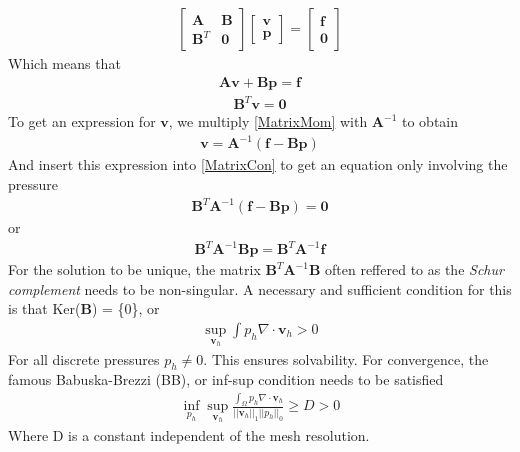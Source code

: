 \begin{align}
\begin{bmatrix}
\mathbf{A} & \mathbf{B} \\
\mathbf{B}^T & \mathbf{0}
\end{bmatrix}
\begin{bmatrix}
\mathbf{v} \\
\mathbf{p}
\end{bmatrix}   = 
\begin{bmatrix}
\mathbf{f} \\
\mathbf{0}
\end{bmatrix}
\end{align}
Which means that
\begin{align}
\mathbf{A}\mathbf{v} + \mathbf{B}\mathbf{p} = \mathbf{f} \label{MatrixMom}
\end{align}
\begin{align}
\mathbf{B}^T \mathbf{v} = \mathbf{0}   \label{MatrixCon}
\end{align}
To get an expression for $\mathbf{v}$, we multiply \eqref{MatrixMom} with $\mathbf{A}^{-1}$ to obtain
\begin{align}
\mathbf{v} = \mathbf{A}^{-1}(\mathbf{f} - \mathbf{B}\mathbf{p})
\end{align}
And insert this expression into \eqref{MatrixCon} to get an equation only involving the pressure
\begin{align}
\mathbf{B}^T \mathbf{A}^{-1}(\mathbf{f} - \mathbf{B}\mathbf{p}) = \mathbf{0}
\end{align}
or
\begin{align}
\mathbf{B}^T\mathbf{A}^{-1}\mathbf{B}\mathbf{p} = \mathbf{B}^T\mathbf{A}^{-1}\mathbf{f}
\end{align}
For the solution to be unique, the matrix $\mathbf{B}^T\mathbf{A}^{-1}\mathbf{B}$ often reffered to as the \textit{Schur complement} needs to be non-singular. A necessary and sufficient condition for this is that Ker($\mathbf{B}$) = \{0\}, or
\begin{align}
\sup_{\mathbf{v}_h}\int p_h \nabla \cdot \mathbf{v}_h > 0
\end{align}
For all discrete pressures $p_h \neq 0$. 
This ensures solvability. For convergence, the famous Babuska-Brezzi (BB), or inf-sup condition needs to be satisfied \cite{Brez12}
\begin{align}
\inf_{p_h}\sup_{\mathbf{v}_h} \frac{\int_{\Omega}p_h \nabla \cdot \mathbf{v}_h}{||\mathbf{v}_h||_1 ||p_h||_0} \geq D > 0
\end{align}
Where D is a constant independent of the mesh resolution. 

